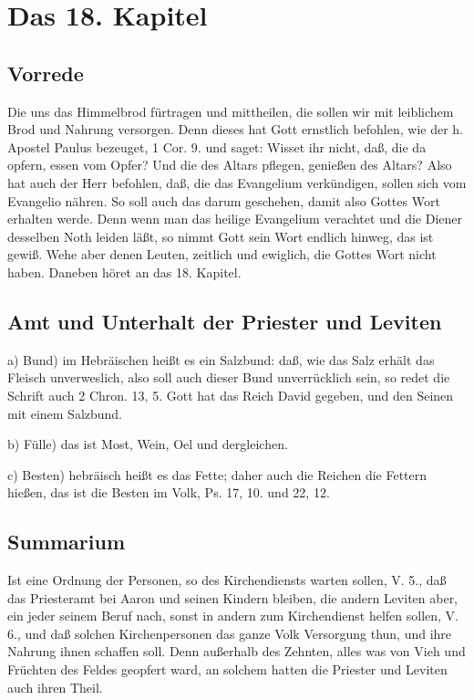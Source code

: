 \chapter{Das 18. Kapitel}

\section{Vorrede}

Die uns das Himmelbrod fürtragen und mittheilen, die sollen wir mit leiblichem Brod und Nahrung versorgen. Denn dieses hat Gott ernstlich befohlen, wie der h. Apostel Paulus bezeuget, 1 Cor. 9. und saget: Wisset ihr nicht, daß, die da opfern, essen vom Opfer? Und die des Altars pflegen, genießen des Altars? Also hat auch der Herr befohlen, daß, die das Evangelium verkündigen, sollen sich vom Evangelio nähren. So soll auch das darum geschehen, damit also Gottes Wort erhalten werde. Denn wenn man das heilige Evangelium verachtet und die Diener desselben Noth leiden läßt, so nimmt Gott sein Wort endlich hinweg, das ist gewiß. Wehe aber denen Leuten, zeitlich und ewiglich, die Gottes Wort nicht haben. Daneben höret an das 18. Kapitel.

\section{Amt und Unterhalt der Priester und Leviten}

a) Bund) im Hebräischen heißt es ein Salzbund: daß, wie das Salz erhält das Fleisch unverweslich, also soll auch dieser Bund unverrücklich sein, so redet die Schrift auch 2 Chron. 13, 5. Gott hat das Reich David gegeben, und den Seinen mit einem Salzbund.

b) Fülle) das ist Most, Wein, Oel und dergleichen.

c) Besten) hebräisch heißt es das Fette; daher auch die Reichen die Fettern hießen, das ist die Besten im Volk, Ps. 17, 10. und 22, 12.

\section{Summarium}

Ist eine Ordnung der Personen, so des Kirchendiensts warten sollen, V. 5., daß das Priesteramt bei Aaron und seinen Kindern bleiben, die andern Leviten aber, ein jeder seinem Beruf nach, sonst in andern zum Kirchendienst helfen sollen, V. 6., und daß solchen Kirchenpersonen das ganze Volk Versorgung thun, und ihre Nahrung ihnen schaffen soll. Denn außerhalb des Zehnten, alles was von Vieh und Früchten des Feldes geopfert ward, an solchem hatten die Priester und Leviten auch ihren Theil.

